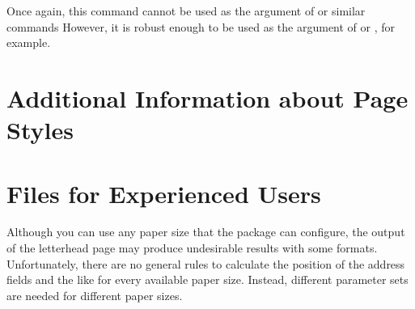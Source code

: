 Once again, this command cannot be used as the argument
of  or similar commands However,
it is robust enough to be used as the argument of
 or , for
example.%
%
\EndIndexGroup
%
\EndIndexGroup


\section{Additional Information about Page Styles}
\BeginIndexGroup
{}

%
\EndIndexGroup

\iffalse%
\section{Differences in How \Package{scrletter} Handles \File{lco} Files}
\seclabel{lcoatscrletter}
\BeginIndexGroup
\BeginIndex{File}{lco}
\BeginIndex{}{lco file=\File{lco} file}

As\ChangedAt{v3.15}{\Package{scrletter}} explained in
\autoref{sec:scrlttr2.lcoFile}, \Class{scrlttr2} can load \File{lco} files via
the optional argument of \Macro{documentclass}. The \Package{scrletter} package
does not support this.

\begin{Declaration}
  \Macro{LoadLetterOption}\Parameter{name}%
  \Macro{LoadLetterOptions}\Parameter{list of names}
\end{Declaration}
For \Class{scrlttr2}, load \File{lco} files with
\DescRef{scrlttr2.cmd.LoadLetterOption} or
\DescRef{scrlttr2.cmd.LoadLetterOptions} is only a recommendation. For
\Package{scrletter}, it is mandatory. Of course, you can only load the
\File{lco} files after you load \Package{scrletter}.
%
\EndIndexGroup
%
\EndIndexGroup
\fi


\section{ Files for Experienced Users}
\BeginIndexGroup
{}

\BeginIndexGroup%
%
Although you can use any paper size that the
\hyperref[cha:typearea]{}%
 package can configure, the output of the letterhead
page may produce undesirable results with some formats. Unfortunately, there
are no general rules to calculate the position of the address fields and the
like for every available paper size. Instead, different parameter sets are
needed for different paper sizes.%


